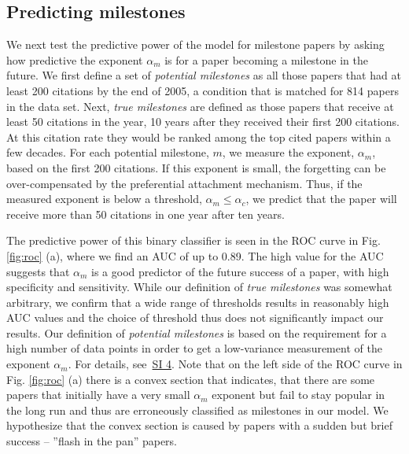 \documentclass[draft,final]{vutinfth} %
\begin{document}
\subsection{Predicting milestones} We next test the predictive power of the model for milestone papers by asking how predictive the exponent $\alpha_m$ is for a paper becoming a milestone in the future. We first define a set of \emph{potential milestones} as all those papers that had at least 200 citations by the end of  2005, a condition that is matched for 814 papers in the data set. Next, {\em true milestones} are defined as those papers that receive at least 50 citations in the year, 10 years after they received their first 200 citations. At this citation rate  they would be ranked among the top cited papers within a few decades. For each potential milestone, $m$, we measure the exponent, $\alpha_m$, based on the first 200 citations.
If this exponent is small, the forgetting can be over-compensated by the preferential attachment mechanism. Thus, if the measured exponent is below a threshold, $\alpha_m \leq \alpha_c$, we predict that the paper will receive more than 50 citations in one year after ten years.

The predictive power of this binary classifier is seen in the ROC curve in Fig. \ref{fig:roc} (a), where we find an AUC of up to 0.89. The high value for the AUC suggests that $\alpha_m$ is a good predictor of the future success of a paper, with high specificity and sensitivity. While our definition of {\em true milestones} was somewhat arbitrary, we confirm that a wide range of thresholds results in reasonably high AUC values and the choice of threshold thus does not significantly impact our results. Our definition of \emph{potential milestones} is based on the requirement for a high number of data points in order to get a low-variance measurement of the exponent $\alpha_m$. For details, see~\hyperref[SIM4]{SI 4}.
Note that on the left side of the ROC curve in Fig. \ref{fig:roc} (a) there is a convex section that indicates, that there are some papers that initially have a very small  $\alpha_m$ exponent but fail to stay popular in the long run and thus are erroneously classified as milestones in our model. We hypothesize that the convex section is caused by papers with a sudden but brief success -- ''flash in the pan'' papers.   
\end{document}
